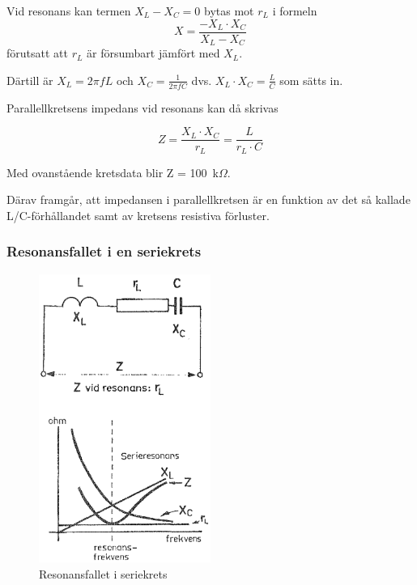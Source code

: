 Vid resonans kan termen \(X_L - X_C = 0\) bytas mot \(r_L\) i formeln
\[X = \frac{-X_L \cdot X_C}{X_L - X_C}\] förutsatt att \(r_L\) är försumbart
jämfört med \(X_L\).

Därtill är \(X_L = 2\pi fL\) och \(X_C = \frac{1}{2\pi fC}\) dvs.
\(X_L \cdot X_C = \frac{L}{C}\) som sätts in.

Parallellkretsens impedans vid resonans kan då skrivas

\[
Z = \frac{X_L \cdot X_C}{r_L} = \frac{L}{r_L \cdot C}
\]

Med ovanstående kretsdata blir Z = 100~k\(\Omega\).

Därav framgår, att impedansen i parallellkretsen är en funktion av det så
kallade L/C-förhållandet samt av kretsens resistiva förluster.

\subsubsection{Resonansfallet i en seriekrets}
\label{serieresonans}

\begin{figure}[ht]
\begin{center}
  \includegraphics[width=0.5\textwidth]{images/cropped_pdfs/bild_2_3-19.pdf}
  \caption{Resonansfallet i seriekrets}
  \label{fig:BildII3-19}
\end{center}
\end{figure}

